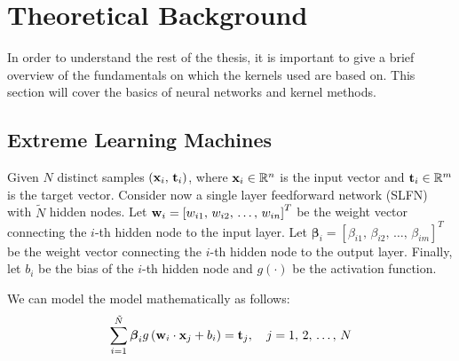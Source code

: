 \chapter{Theoretical Background}%
\label{sec:theoretical_background}

In order to understand the rest of the thesis, it is important to give a brief
overview of the fundamentals on which the kernels used are based on. This
section will cover the basics of neural networks and kernel methods.

\section{Extreme Learning Machines}%
\label{sub:neural_networks_fundamentals}

Given $N$ distinct samples $\left( \textbf x_i,\, \textbf t_i \right)$,
where $\textbf x_i \in \mathbb{R}^n$ is the input vector and $\textbf t_i \in \mathbb{R}^m$
is the target vector. Consider now a single layer feedforward network (SLFN)
with $\tilde{N}$ hidden nodes. Let $\textbf w_i = \left[ w_{i1},\,w_{i2},\,\dots,\,w_{in} \right]^T$
be the weight vector connecting the $i$-th hidden node to the input layer.
Let $\boldsymbol\beta_i = \left[ \beta_{i1},\,\beta_{i2},\,\dots,\,\beta_{im} \right]^T$ be
the weight vector connecting the $i$-th hidden node to the output layer. Finally, let
$b_i$ be the bias of the $i$-th hidden node and $g(\cdot)$ be the activation function.

We can model the model mathematically as follows:
\begin{equation}%
    \label{eq:slfn}
    \sum_{i=1}^{\tilde{N}} \boldsymbol\beta_{i} g\left( \textbf w_i \cdot \textbf x_j + b_i \right) = \textbf t_j, \quad j = 1,\,2,\,\dots,\,N
\end{equation}

